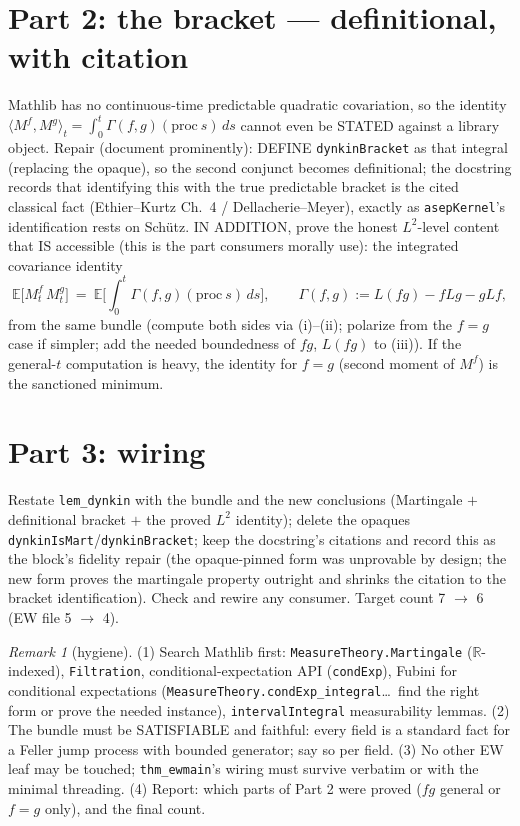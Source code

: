 \documentclass[11pt]{article}
\theoremstyle{plain}
\theoremstyle{remark}
\newtheorem{remark}{Remark}
\newcommand{\E}{\mathbb{E}}\newcommand{\R}{\mathbb{R}}
\begin{document}
\section*{Part 2: the bracket --- definitional, with citation}

Mathlib has no continuous-time predictable quadratic covariation, so the
identity $\langle M^f,M^g\rangle_t=\int_0^t\Gamma(f,g)(\mathrm{proc}\ s)\,ds$
cannot even be STATED against a library object. Repair (document prominently):
DEFINE \texttt{dynkinBracket} as that integral (replacing the opaque), so the
second conjunct becomes definitional; the docstring records that identifying
this with the true predictable bracket is the cited classical fact
(Ethier--Kurtz Ch.~4 / Dellacherie--Meyer), exactly as \texttt{asepKernel}'s
identification rests on Sch\"utz. IN ADDITION, prove the honest
$L^2$-level content that IS accessible (this is the part consumers morally
use): the integrated covariance identity
\[
  \E\big[M^f_t\,M^g_t\big]\ =\ \E\Big[\int_0^t\Gamma(f,g)(\mathrm{proc}\ s)\,ds\Big],
  \qquad
  \Gamma(f,g):=L(fg)-fLg-gLf,
\]
from the same bundle (compute both sides via (i)--(ii); polarize from the
$f=g$ case if simpler; add the needed boundedness of $fg$, $L(fg)$ to (iii)).
If the general-$t$ computation is heavy, the identity for $f=g$
(second moment of $M^f$) is the sanctioned minimum.

\section*{Part 3: wiring}

Restate \texttt{lem\_dynkin} with the bundle and the new conclusions
(Martingale $+$ definitional bracket $+$ the proved $L^2$ identity); delete
the opaques \texttt{dynkinIsMart}/\texttt{dynkinBracket}; keep the docstring's
citations and record this as the block's fidelity repair (the opaque-pinned
form was unprovable by design; the new form proves the martingale property
outright and shrinks the citation to the bracket identification). Check and
rewire any consumer. Target count 7 $\to$ 6 (EW file 5 $\to$ 4).

\begin{remark}[hygiene]
(1) Search Mathlib first: \texttt{MeasureTheory.Martingale} ($\R$-indexed),
\texttt{Filtration}, conditional-expectation API
(\texttt{condExp}), Fubini for conditional expectations
(\texttt{MeasureTheory.condExp\_integral}\dots\ find the right form or prove
the needed instance), \texttt{intervalIntegral} measurability lemmas.
(2) The bundle must be SATISFIABLE and faithful: every field is a standard
fact for a Feller jump process with bounded generator; say so per field.
(3) No other EW leaf may be touched; \texttt{thm\_ewmain}'s wiring must
survive verbatim or with the minimal threading.
(4) Report: which parts of Part 2 were proved ($fg$ general or $f=g$ only),
and the final count.
\end{remark}
\end{document}
